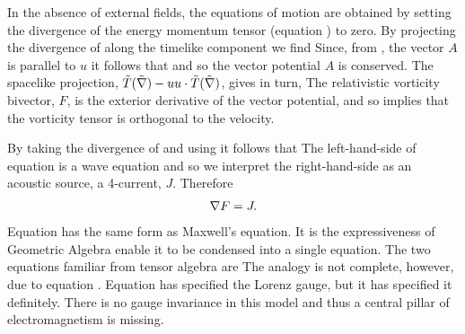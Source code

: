 In the absence of external fields, the equations of motion are obtained by setting the 
 divergence of the energy momentum tensor (equation ) to zero.
By projecting the divergence of  along the timelike component we find
Since, from , the vector $A$ is parallel to $u$  it follows that 
and so the vector potential $A$ is conserved.
The spacelike projection,
$\tilde{T}(\tilde{\nabla}) - u u\cdot \tilde{T}(\tilde{\nabla})$, gives in turn,
The relativistic vorticity bivector, $F$, is the exterior derivative  of the vector potential, 
and so  implies that the vorticity tensor is orthogonal to the velocity.

By taking the divergence of  and using  it follows that 
The left-hand-side of equation  is a wave equation and so we interpret the right-hand-side as an acoustic source,
a 4-current, $J$.
Therefore 
\begin{align}
\label{eqn:Maxwell}
\nabla F =J.
\end{align}
Equation  has the same form as Maxwell's equation. 
It is the expressiveness of Geometric Algebra enable it to be condensed into a single equation.
The two equations familiar from tensor algebra are 
The analogy is not complete, however, due to equation .
Equation  has specified the Lorenz gauge,
but it has specified it definitely.
There is no gauge invariance in this model and thus a central pillar of electromagnetism is missing.

